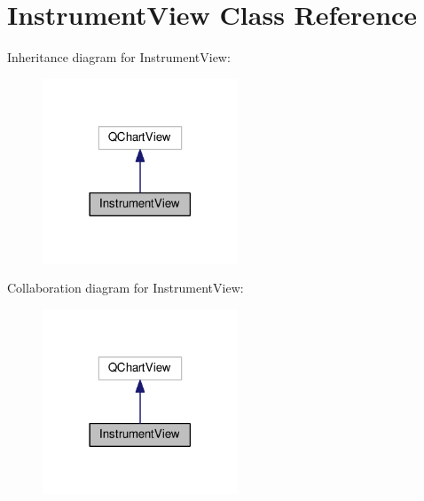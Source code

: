 \hypertarget{class_instrument_view}{}\section{Instrument\+View Class Reference}
\label{class_instrument_view}


Inheritance diagram for Instrument\+View\+:\nopagebreak
\begin{figure}[H]
\begin{center}
\leavevmode
\includegraphics[width=165pt]{class_instrument_view__inherit__graph}
\end{center}
\end{figure}


Collaboration diagram for Instrument\+View\+:\nopagebreak
\begin{figure}[H]
\begin{center}
\leavevmode
\includegraphics[width=165pt]{class_instrument_view__coll__graph}
\end{center}
\end{figure}
